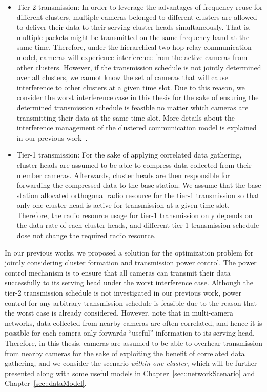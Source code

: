 \begin{itemize}
\item Tier-2 transmission: In order to leverage the advantages of frequency reuse for different clusters, multiple cameras belonged to different clusters are allowed to deliver their data to their serving cluster heads simultaneously.
That is, multiple packets might be transmitted on the same frequency band at the same time.
Therefore, under the hierarchical two-hop relay communication model, cameras will experience interference from the active cameras from other clusters.
However, if the transmission schedule is not jointly determined over all clusters, we cannot know the set of cameras that will cause interference to other clusters at a given time slot.
Due to this reason, we consider the worst interference case in this thesis for the sake of ensuring the determined transmission schedule is feasible no matter which cameras are transmitting their data at the same time slot.
More details about the interference management of the clustered communication model is explained in our previous work~\cite{steven}.
\item Tier-1 transmission: For the sake of applying correlated data gathering, cluster heads are assumed to be able to compress data collected from their member cameras.
Afterwards, cluster heads are then responsible for forwarding the compressed data to the base station.
We assume that the base station allocated orthogonal radio resource for the tier-1 transmission so that only one cluster head is active for transmission at a given time slot.
Therefore, the radio resource usage for tier-1 transmission only depends on the data rate of each cluster heads, and different tier-1 transmission schedule dose not change the required radio resource. 
\end{itemize}

In our previous works, we proposed a solution for the optimization problem for jointly considering cluster formation and transmission power control.
The power control mechanism is to ensure that all cameras can transmit their data successfully to its serving head under the worst interference case.
Although the tier-2 transmission schedule is not investigated in our previous work, power control for any arbitrary transmission schedule is feasible due to the reason that the worst case is already considered.
However, note that in multi-camera networks, data collected from nearby cameras are often correlated, and hence it is possible for each camera only forwards ``useful'' information to its serving head.
Therefore, in this thesis, cameras are assumed to be able to overhear transmission from nearby cameras for the sake of exploiting the benefit of correlated data gathering, and we consider the scenario \emph{within one cluster}, which will be further presented along with some useful models in Chapter~\ref{sec::networkScenario} and Chapter~\ref{sec::dataModel}.
